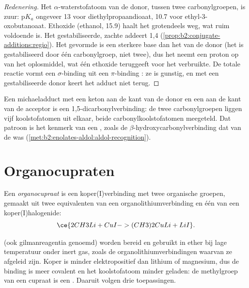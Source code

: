 \begin{proof}[Redenering]
Het $\alpha$-waterstofatoom van de donor, tussen twee carbonylgroepen, is zuur: $\mathrm pK_a$ ongeveer 13 voor
diethylpropaandioaat, 10.7 voor ethyl-3-oxobutanoaat. Ethoxide (ethanol, 15.9) haalt het grotendeels weg, wat
ruim voldoende is. Het gestabiliseerde, zachte  addeert 1,4
(\cref{prop:b2:conjugate-additions:regio}). Het gevormde  is een sterkere base dan het  van de donor
(het is gestabiliseerd door één carbonylgroep, niet twee), dus het neemt een proton op van het oplosmiddel, wat
één ethoxide teruggeeft voor het verbruikte. De totale reactie vormt een $\sigma$-binding  uit een
$\pi$-binding : ze is gunstig, en met een gestabiliseerde donor keert het adduct niet terug.
\end{proof}

Een michaeladduct met een keton aan de kant van de donor en een aan de kant van de acceptor is een
1,5-dicarbonylverbinding: de twee carbonylgroepen liggen vijf koolstofatomen uit elkaar, beide carbonylkoolstofatomen meegeteld. Dat patroon is het
kenmerk van een , zoals de $\beta$-hydroxycarbonylverbinding dat van de  was
(\cref{met:b2:enolates-aldol:aldol-recognition}).

\section{Organocupraten}

\begin{definition}[Organocupraten]\label{def:b2:conjugate-additions:cuprate}
Een \emph{organocupraat}  is een koper(I)verbinding met twee organische
groepen, gemaakt uit twee equivalenten van een organolithiumverbinding en één van een koper(I)halogenide:
\begin{equation*}
\ce{2 CH3Li + CuI -> (CH3)2CuLi + LiI}.
\end{equation*}
\end{definition}

 (ook gilmanreagentia genoemd) worden bereid en gebruikt in ether bij lage temperatuur onder
inert gas, zoals de organolithiumverbindingen waarvan ze afgeleid zijn. Koper is minder elektropositief dan lithium of
magnesium, dus de binding  is meer covalent en het koolstofatoom minder geladen: de methylgroep van een
cupraat is een . Daaruit volgen drie toepassingen.

